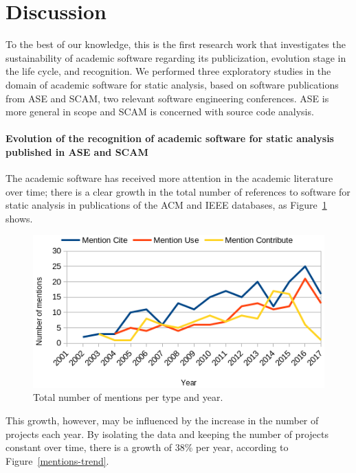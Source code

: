 \section{Discussion} \label{sec:discussion}

To the best of our knowledge, this is the first research work that investigates
the sustainability of academic software regarding its publicization, evolution
stage in the life cycle, and recognition. 
We performed three exploratory studies in the domain of
academic software for static analysis, based on software publications from ASE
and SCAM, two relevant software engineering conferences. ASE is more general in
scope and SCAM is concerned with source code analysis.

\paragraph{\bf Evolution of the recognition of academic software for static
analysis published in ASE and SCAM} The academic software has received more
attention in the academic literature over time; there is a clear
growth in the total number of references to software for static analysis in
publications of the ACM and IEEE databases, as Figure~\ref{mentions-by-year}
shows.

\begin{figure}[ht]
  \centering
  \includegraphics[scale=0.59]{figs/mentions-type-by-year.png}
  \caption{Total number of mentions per type and year.}
  \label{mentions-by-year}
\end{figure}

This growth, however, may be influenced by the increase in the number of
projects each year. By isolating the data and keeping the number of projects
constant over time, there is a growth of 38\% per year, according to
Figure~\ref{mentions-trend}.

